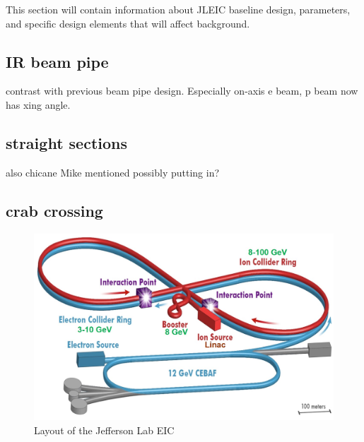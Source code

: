 This section will contain information about JLEIC baseline design, parameters, and specific design elements that will affect background.  
\subsection{IR beam pipe}
contrast with previous beam pipe design.  Especially on-axis e beam, p beam now has xing angle.  
\subsection{straight sections}
also chicane Mike mentioned possibly putting in?
\subsection{crab crossing}


\begin{figure}
	\centering
	\includegraphics[width=.75\textwidth]{../../img/jleic_layout.jpg}
	\caption{Layout of the Jefferson Lab EIC}
	\label{fig:jleic1}
\end{figure}